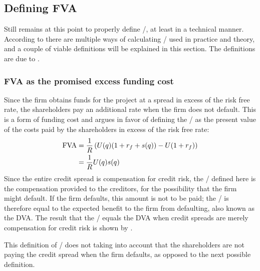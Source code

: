 \documentclass[../main.tex]{subfiles}
\begin{document}
    \subsection{Defining FVA}
        Still remains at this point to properly define \FVA/, at least in a technical manner.
        According to \cite{ADS2019} there are multiple ways of calculating \FVA/ used in practice and theory,
        and a couple of viable definitions will be explained in this section.
        The definitions are due to \cite{Hillion2016}.

        \subsubsection{FVA as the promised excess funding cost}
            Since the firm obtains funds for the project at a spread in excess of the risk free rate, 
            the shareholders pay an additional rate when the firm does not default. 
            This is a form of funding cost and argues in favor of defining the \FVA/ as
            the present value of the costs paid by the shareholders in excess of the risk free rate:
                \begin{align}
                    \FVA/ 
                    &= 
                        \discountfactor \left(
                            U(q) (1 + \rfrate + s(q))
                            - U (1 + \rfrate)
                        \right) 
                        \nonumber \\
                    &= 
                        \discountfactor U(q) s(q)
                    \label{eqn:fva-as-promised-excess-funding-cost}
                \end{align}
            Since the entire credit spread is compensation for credit risk,
            the \FVA/ defined here is the compensation provided to the creditors,
            for the possibility that the firm might default. 
            If the firm defaults, this amount is not to be paid; 
            the \FVA/ is therefore equal to the expected benefit to the firm from defaulting, also known as the DVA. 
            The result that the \FVA/ equals the DVA when credit spreads are merely compensation for credit risk
            is shown by \cite{HullWhiteFVA}.

            This definition of \FVA/ does not taking into account 
            that the shareholders are not paying the credit spread when the firm defaults, 
            as opposed to the next possible definition.
\end{document}
